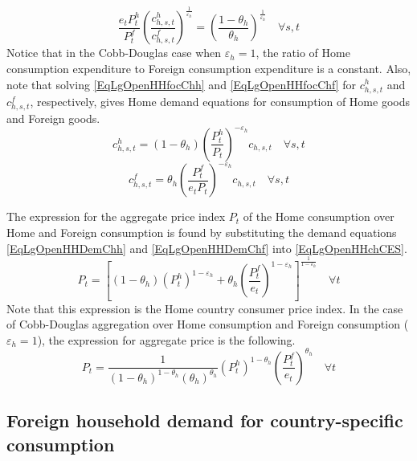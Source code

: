 \documentclass[letterpaper,12pt]{article}
\theoremstyle{definition}
\newcommand\ve{\varepsilon}
\begin{document}
    \begin{equation}\label{EqLgOpenHHFracExpDomFor}
      \frac{e_t P^h_t}{P^f_t}\left(\frac{c^h_{h,s,t}}{c^f_{h,s,t}}\right)^{\frac{1}{\ve_h}} = \left(\frac{1-\theta_h}{\theta_h}\right)^{\frac{1}{\ve_h}} \quad\forall s,t
    \end{equation}
    Notice that in the Cobb-Douglas case when $\ve_h=1$, the ratio of Home consumption expenditure to Foreign consumption expenditure is a constant. Also, note that solving \eqref{EqLgOpenHHfocChh} and \eqref{EqLgOpenHHfocChf} for $c^h_{h,s,t}$ and $c^f_{h,s,t}$, respectively, gives Home demand equations for consumption of Home goods and Foreign goods.
    \begin{equation}\label{EqLgOpenHHDemChh}
          c^h_{h,s,t} = (1-\theta_h)\left(\frac{P^h_t}{P_t}\right)^{-\ve_h}c_{h,s,t} \quad\forall s,t
    \end{equation}
    \begin{equation}\label{EqLgOpenHHDemChf}
          c^f_{h,s,t} = \theta_h \left(\frac{P^f_t}{e_t P_t}\right)^{-\ve_h}c_{h,s,t} \quad\forall s,t
    \end{equation}

    The expression for the aggregate price index $P_t$ of the Home consumption over Home and Foreign consumption is found by substituting the demand equations \eqref{EqLgOpenHHDemChh} and \eqref{EqLgOpenHHDemChf} into \eqref{EqLgOpenHHchCES}.
    \begin{equation}\label{EqLgOpenHHaggPr}
      P_t = \left[(1-\theta_h)\left(P^h_t\right)^{1-\ve_h} + \theta_h\left(\frac{P^f_t}{e_t}\right)^{1-\ve_h}\right]^{\frac{1}{1-\ve_h}} \quad\forall t
    \end{equation}
    Note that this expression is the Home country consumer price index. In the case of Cobb-Douglas aggregation over Home consumption and Foreign consumption ($\ve_h=1$), the expression for aggregate price is the following.
    \begin{equation}\label{EqLgOpenHHaggPrCobb}
      P_t = \frac{1}{(1-\theta_h)^{1-\theta_h}(\theta_h)^{\theta_h}} \left(P^h_t\right)^{1-\theta_h}\left(\frac{P^f_t}{e_t}\right)^{\theta_h} \quad\forall t
    \end{equation}


  \subsection{Foreign household demand for country-specific consumption}\label{SecLgOpenHHforSpec}
\end{document}
